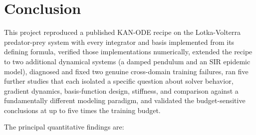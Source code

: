 \section{Conclusion}
\label{sec:conclusion}

This project reproduced a published KAN-ODE recipe on the Lotka-Volterra
predator-prey system with every integrator and basis implemented from its
defining formula, verified those implementations numerically, extended the
recipe to two additional dynamical systems (a damped pendulum and an SIR
epidemic model), diagnosed and fixed two genuine cross-domain training
failures, ran five further studies that each isolated a specific question
about solver behavior, gradient dynamics, basis-function design, stiffness,
and comparison against a fundamentally different modeling paradigm, and
validated the budget-sensitive conclusions at up to five times the training
budget.

The principal quantitative findings are:

